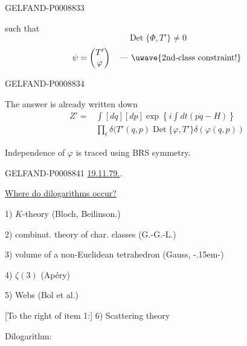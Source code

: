 \begin{GelfandAdjacentEvidence}{GELFAND-P000883}{3}


such that
\begin{equation*}
\operatorname{Det}\{\Phi,T'\}\ne0
\tag{37}
\end{equation*}
\begin{equation*}
\psi=\begin{pmatrix}T'\\\varphi\end{pmatrix}
\quad\text{--- \uwave{2nd-class constraint!}}
\end{equation*}
\end{GelfandAdjacentEvidence}
\begin{GelfandAdjacentEvidence}{GELFAND-P000883}{4}


The answer is already written down
\begin{equation*}
\begin{aligned}
Z'={}&\int[dq][dp]\exp\left\{i\int dt(p\dot q-H)\right\}\\
&{}\prod_t\delta(T'(q,p)\operatorname{Det}\{\varphi,T'\}\delta(\varphi(q,p))
\end{aligned}
\end{equation*}
\end{GelfandAdjacentEvidence}


Independence of $\varphi$ is traced using BRS symmetry.


\begin{GelfandAdjacentEvidence}{GELFAND-P000884}{1}
\uline{19.11.79.}\qquad {}.

\uline{Where do dilogarithms occur?}

1) $K$-theory (Bloch, Beilinson.)

2) combinat. theory of char. classes (G.-G.-L.)

3) volume of a non-Euclidean tetrahedron (Gauss, -\kern.15em-)

4) $\zeta(3)$ (Apéry)

5) Webs (Bol et al.)

[To the right of item 1:] 6) Scattering theory

Dilogarithm:
\end{GelfandAdjacentEvidence}

